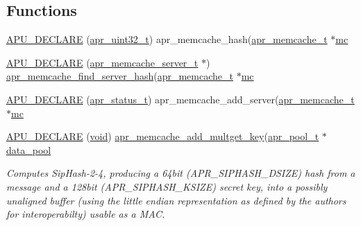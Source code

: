 \subsection*{Functions}
\begin{DoxyCompactItemize}
\item 
\hyperlink{group__APR__Util__MC_gab3e8ee11a7cf2fbc0a9d782d66a35136}{A\+P\+U\+\_\+\+D\+E\+C\+L\+A\+RE} (\hyperlink{group__apr__platform_ga558548a135d8a816c4787250744ea147}{apr\+\_\+uint32\+\_\+t}) apr\+\_\+memcache\+\_\+hash(\hyperlink{structapr__memcache__t}{apr\+\_\+memcache\+\_\+t} $\ast$\hyperlink{group__APR__Util__MC_ga1cf8c9d89cfb411f224cae715e8c2aaa}{mc}
\item 
\hyperlink{group__APR__Util__MC_ga2b4f1cc9a0f5b63d7f0f5cd37cb48e1b}{A\+P\+U\+\_\+\+D\+E\+C\+L\+A\+RE} (\hyperlink{structapr__memcache__server__t}{apr\+\_\+memcache\+\_\+server\+\_\+t} $\ast$) \hyperlink{apr__memcache_8c_a37f48842d3bcb0bc6e171b064fa36c74}{apr\+\_\+memcache\+\_\+find\+\_\+server\+\_\+hash}(\hyperlink{structapr__memcache__t}{apr\+\_\+memcache\+\_\+t} $\ast$\hyperlink{group__APR__Util__MC_ga1cf8c9d89cfb411f224cae715e8c2aaa}{mc}
\item 
\hyperlink{group__APR__Util__MC_ga1d76a63ba30847e34592079736207a5b}{A\+P\+U\+\_\+\+D\+E\+C\+L\+A\+RE} (\hyperlink{group__apr__errno_gaa5105fa83cc322f09382292db8b47593}{apr\+\_\+status\+\_\+t}) apr\+\_\+memcache\+\_\+add\+\_\+server(\hyperlink{structapr__memcache__t}{apr\+\_\+memcache\+\_\+t} $\ast$\hyperlink{group__APR__Util__MC_ga1cf8c9d89cfb411f224cae715e8c2aaa}{mc}
\item 
\hyperlink{group__APR__Util__MC_ga3522184f3a9cbe0087431183864fff8b}{A\+P\+U\+\_\+\+D\+E\+C\+L\+A\+RE} (\hyperlink{group__MOD__ISAPI_gacd6cdbf73df3d9eed42fa493d9b621a6}{void}) \hyperlink{apr__memcache_8c_a71aeaf99e4a0f0b8d70dec5faa78b2ac}{apr\+\_\+memcache\+\_\+add\+\_\+multget\+\_\+key}(\hyperlink{structapr__pool__t}{apr\+\_\+pool\+\_\+t} $\ast$\hyperlink{group__APR__Util__RC_ga225953f0223e74926c10078f71a9510e}{data\+\_\+pool}
\begin{DoxyCompactList}\small\item\em Computes Sip\+Hash-\/2-\/4, producing a 64bit (A\+P\+R\+\_\+\+S\+I\+P\+H\+A\+S\+H\+\_\+\+D\+S\+I\+ZE) hash from a message and a 128bit (A\+P\+R\+\_\+\+S\+I\+P\+H\+A\+S\+H\+\_\+\+K\+S\+I\+ZE) secret key, into a possibly unaligned buffer (using the little endian representation as defined by the authors for interoperabilty) usable as a M\+AC. \end{DoxyCompactList}\end{DoxyCompactItemize}
